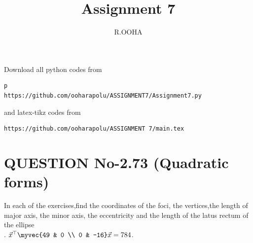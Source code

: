 \documentclass[journal,12pt,twocolumn]{IEEEtran}
\begin{document}
     \def\rightbox#1{\makebox[0in][r]{#1}}
     \def\centbox#1{\makebox[0in]{#1}}
     \def\topbox#1{\raisebox{-\baselineskip}[0in][0in]{#1}}
     \def\midbox#1{\raisebox{-0.5\baselineskip}[0in][0in]{#1}}
\vspace{3cm}
\title{Assignment 7}
\author{R.OOHA}
\maketitle
\newpage
\bigskip
\renewcommand{\thefigure}{\theenumi}
\renewcommand{\thetable}{\theenumi}
Download all python codes from 
\begin{lstlisting}p
https://github.com/ooharapolu/ASSIGNMENT7/Assignment7.py
\end{lstlisting}
%
and latex-tikz codes from 
%
\begin{lstlisting}
https://github.com/ooharapolu/ASSIGNMENT 7/main.tex
\end{lstlisting}
%
\section{QUESTION No-2.73 (Quadratic forms)}
 In each of the exercises,find the coordinates of the foci, the vertices,the length of major axis, the minor axis, the eccentricity and the length of the latus rectum of the ellipse 
 \\
 . $\vec{x}^{\top}\myvec{49 & 0 \\ 0 & -16}\vec{x} = 784$.
%
\end{document}
